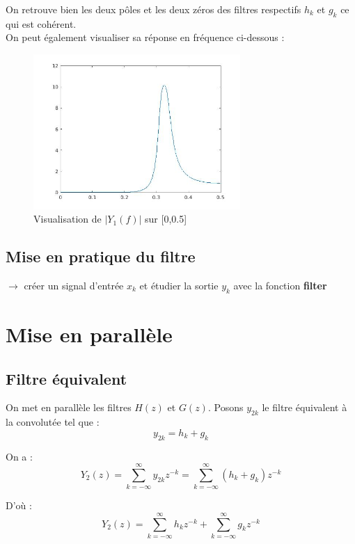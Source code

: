 \documentclass[12,french]{report}
\begin{document}
On retrouve bien les deux pôles et les deux zéros des filtres respectifs $h_k$ et $g_k$ ce qui est cohérent.\\

On peut également visualiser sa réponse en fréquence ci-dessous :

\begin{figure}[H]
	\center
	\includegraphics[width=0.7\textwidth]{./Images/freqz_Y1}
	\caption{Visualisation de $|Y_1(f)|$ sur [0,0.5]}
\end{figure}\vspace{0.2cm}


\section{Mise en pratique du filtre}

$\rightarrow$ créer un signal d'entrée $x_k$ et étudier la sortie $y_k$ avec la fonction \textbf{filter}



\chapter{Mise en parallèle}

\section{Filtre équivalent}

On met en parallèle les filtres $H(z)$ et $G(z)$. Posons $y_{2k}$ le filtre équivalent à la convolutée tel que : 
$$y_{2k}=h_k+g_k$$

On a :
$$ Y_2(z)=\sum_{k=-\infty}^{\infty}y_{2k}z^{-k}=\sum_{k=-\infty}^{\infty}(h_k+g_k)z^{-k} $$

D'où :
$$ Y_2(z)=\sum_{k=-\infty}^{\infty}h_kz^{-k}+\sum_{k=-\infty}^{\infty}g_kz^{-k} $$
\end{document}
